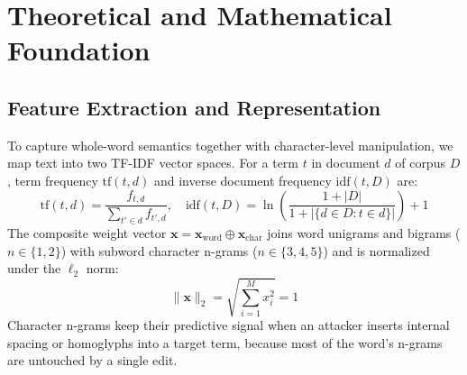 \documentclass[conference]{IEEEtran}
\begin{document}
\begin{table}[!t]
\caption{Comparison of Existing Research Works and Their Limitations.}
\label{tab:lit_comparison}
\centering\footnotesize
{}
\end{table}

\section{Theoretical and Mathematical Foundation}
\label{sec:theory}

\subsection{Feature Extraction and Representation}
To capture whole-word semantics together with character-level manipulation, we map text into two TF-IDF vector spaces. For a term $t$ in document $d$ of corpus $D$, term frequency $\text{tf}(t,d)$ and inverse document frequency $\text{idf}(t,D)$ are:
\begin{equation}
\text{tf}(t, d) = \frac{f_{t,d}}{\sum_{t' \in d} f_{t',d}}, \quad
\text{idf}(t, D) = \ln\left(\frac{1 + |D|}{1 + |\{d \in D : t \in d\}|}\right) + 1
\end{equation}
The composite weight vector $\mathbf{x} = \mathbf{x}_{\text{word}} \oplus \mathbf{x}_{\text{char}}$ joins word unigrams and bigrams ($n \in \{1,2\}$) with subword character n-grams ($n \in \{3,4,5\}$) and is normalized under the $\ell_2$ norm:
\begin{equation}
\|\mathbf{x}\|_2 = \sqrt{\sum_{i=1}^{M} x_i^2} = 1
\end{equation}
Character n-grams keep their predictive signal when an attacker inserts internal spacing or homoglyphs into a target term, because most of the word's n-grams are untouched by a single edit.
\end{document}
